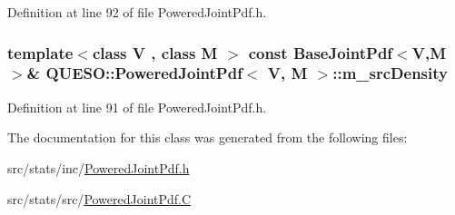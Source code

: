 Definition at line 92 of file Powered\-Joint\-Pdf.\-h.

\hypertarget{class_q_u_e_s_o_1_1_powered_joint_pdf_a80cd4ecb6f5dc0e1f61d0317ef07a616}{
\subsubsection[{m\-\_\-src\-Density}]{\setlength{\rightskip}{0pt plus 5cm}template$<$class V , class M $>$ const {\bf Base\-Joint\-Pdf}$<$V,M$>$\& {\bf Q\-U\-E\-S\-O\-::\-Powered\-Joint\-Pdf}$<$ V, M $>$\-::m\-\_\-src\-Density\hspace{0.3cm}{\ttfamily [protected]}}}\label{class_q_u_e_s_o_1_1_powered_joint_pdf_a80cd4ecb6f5dc0e1f61d0317ef07a616}


Definition at line 91 of file Powered\-Joint\-Pdf.\-h.



The documentation for this class was generated from the following files\-:\begin{DoxyCompactItemize}
\item 
src/stats/inc/\hyperlink{_powered_joint_pdf_8h}{Powered\-Joint\-Pdf.\-h}\item 
src/stats/src/\hyperlink{_powered_joint_pdf_8_c}{Powered\-Joint\-Pdf.\-C}\end{DoxyCompactItemize}
